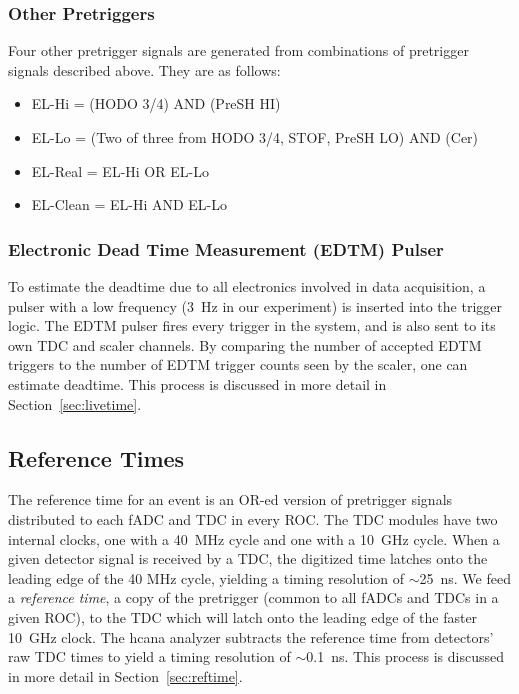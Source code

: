 \subsubsection{Other Pretriggers}
Four other pretrigger signals are generated from combinations of pretrigger
signals described above.
They are as follows:

\begin{itemize}
    \item EL-Hi = (HODO 3/4) AND (PreSH HI)
    \item EL-Lo = (Two of three from {HODO 3/4, STOF, PreSH LO}) AND (Cer)
    \item EL-Real = EL-Hi OR EL-Lo
    \item EL-Clean = EL-Hi AND EL-Lo
\end{itemize}

\subsubsection{Electronic Dead Time Measurement (EDTM) Pulser}
\label{sec:edtm}
To estimate the deadtime due to all electronics involved in data acquisition, a
pulser with a low frequency (\SI{3}{\hertz} in our experiment) is inserted into the
trigger logic.
The EDTM pulser fires every trigger in the system, and is also sent to its own
TDC and scaler channels.
By comparing the number of accepted EDTM triggers to the number of EDTM trigger
counts seen by the scaler, one can estimate deadtime.
This process is discussed in more detail in Section~\ref{sec:livetime}.

\subsection{Reference Times}
The reference time for an event is an OR-ed version of pretrigger signals
distributed to each fADC and TDC in every ROC.
The TDC modules have two internal clocks, one with a \SI{40}{MHz} cycle and one
with a \SI{10}{GHz} cycle.
When a given detector signal is received by a TDC, the digitized time latches
onto the leading edge of the 40 MHz cycle, yielding a timing resolution of
$\sim$\SI{25}{ns}.
We feed a \textit{reference time}, a copy of the pretrigger (common to all
fADCs and TDCs in a given ROC), to the TDC which will latch onto the leading
edge of the faster \SI{10}{GHz} clock.
The hcana analyzer subtracts the reference time from detectors' raw
TDC times to yield a timing resolution of $\sim$\SI{0.1}{ns}.
This process is discussed in more detail in Section~\ref{sec:reftime}.
